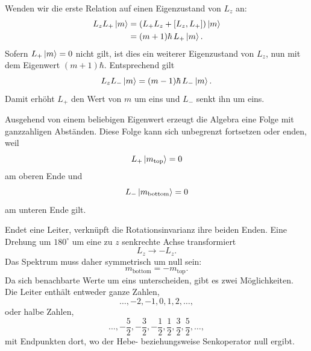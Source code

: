 Wenden wir die erste Relation auf einen Eigenzustand von \(L_z\) an:
\begin{align}
L_zL_+\left\lvert m\right\rangle
&=\left(L_+L_z+[L_z,L_+]\right)\left\lvert m\right\rangle\\
&=(m+1)\hbar\,L_+\left\lvert m\right\rangle.
\end{align}
Sofern \(L_+\left\lvert m\right\rangle=0\) nicht gilt, ist dies ein weiterer Eigenzustand von \(L_z\), nun mit dem Eigenwert \((m+1)\hbar\). Entsprechend gilt
\begin{equation}
L_zL_-\left\lvert m\right\rangle
=(m-1)\hbar\,L_-\left\lvert m\right\rangle.
\end{equation}
Damit erhöht \(L_+\) den Wert von \(m\) um eins und \(L_-\) senkt ihn um eins.

Ausgehend von einem beliebigen Eigenwert erzeugt die Algebra eine Folge mit ganzzahligen Abständen. Diese Folge kann sich unbegrenzt fortsetzen oder enden, weil
\begin{equation}
L_+\left\lvert m_{\mathrm{top}}\right\rangle=0
\end{equation}
am oberen Ende und
\begin{equation}
L_-\left\lvert m_{\mathrm{bottom}}\right\rangle=0
\end{equation}
am unteren Ende gilt.

\begin{classroomqa}
\end{classroomqa}

Endet eine Leiter, verknüpft die Rotationsinvarianz ihre beiden Enden. Eine Drehung um \(180^\circ\) um eine zu \(z\) senkrechte Achse transformiert
\begin{equation}
L_z\longrightarrow-L_z.
\end{equation}
Das Spektrum muss daher symmetrisch um null sein:
\begin{equation}
m_{\mathrm{bottom}}=-m_{\mathrm{top}}.
\end{equation}
Da sich benachbarte Werte um eins unterscheiden, gibt es zwei Möglichkeiten. Die Leiter enthält entweder ganze Zahlen,
\begin{equation}
\ldots,-2,-1,0,1,2,\ldots,
\end{equation}
oder halbe Zahlen,
\begin{equation}
\ldots,-\frac{5}{2},-\frac{3}{2},-\frac{1}{2},
\frac{1}{2},\frac{3}{2},\frac{5}{2},\ldots,
\end{equation}
mit Endpunkten dort, wo der Hebe- beziehungsweise Senkoperator null ergibt.

